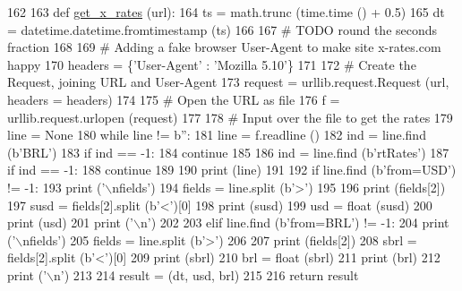 \begin{DoxyCode}
162 
163 \textcolor{keyword}{def }\hyperlink{namespaceraw__urlparser_a264ca664879b007ee92399e30ec0d9bc}{get\_x\_rates} (url):
164     ts = math.trunc (time.time () + 0.5)
165     dt = datetime.datetime.fromtimestamp (ts)
166     
167     \textcolor{comment}{# TODO round the seconds fraction}
168     
169     \textcolor{comment}{# Adding a fake browser User-Agent to make site x-rates.com happy}
170     headers = \{\textcolor{stringliteral}{'User-Agent'} : \textcolor{stringliteral}{'Mozilla 5.10'}\}
171         
172     \textcolor{comment}{# Create the Request, joining URL and User-Agent}
173     request = urllib.request.Request (url, headers = headers)
174 
175     \textcolor{comment}{# Open the URL as file}
176     f = urllib.request.urlopen (request)
177     
178     \textcolor{comment}{# Input over the file to get the rates}
179     line = \textcolor{keywordtype}{None}
180     \textcolor{keywordflow}{while} line != b\textcolor{stringliteral}{''}:
181         line = f.readline ()
182         ind = line.find (b\textcolor{stringliteral}{'BRL'})
183         \textcolor{keywordflow}{if} ind == -1:
184             \textcolor{keywordflow}{continue} 
185         
186         ind = line.find (b\textcolor{stringliteral}{'rtRates'})
187         \textcolor{keywordflow}{if} ind == -1:
188             \textcolor{keywordflow}{continue} 
189         
190         \textcolor{keywordflow}{print} (line)
191         
192         \textcolor{keywordflow}{if} line.find (b\textcolor{stringliteral}{'from=USD'}) != -1:
193             \textcolor{keywordflow}{print} (\textcolor{stringliteral}{'\(\backslash\)nfields'})
194             fields = line.split (b\textcolor{stringliteral}{'>'})
195             
196             \textcolor{keywordflow}{print} (fields[2])
197             susd = fields[2].split (b\textcolor{stringliteral}{'<'})[0]
198             \textcolor{keywordflow}{print} (susd)
199             usd = float (susd)
200             \textcolor{keywordflow}{print} (usd)
201             \textcolor{keywordflow}{print} (\textcolor{stringliteral}{'\(\backslash\)n'})
202         
203         \textcolor{keywordflow}{elif} line.find (b\textcolor{stringliteral}{'from=BRL'}) != -1:
204             \textcolor{keywordflow}{print} (\textcolor{stringliteral}{'\(\backslash\)nfields'})
205             fields = line.split (b\textcolor{stringliteral}{'>'})
206             
207             \textcolor{keywordflow}{print} (fields[2])
208             sbrl = fields[2].split (b\textcolor{stringliteral}{'<'})[0]
209             \textcolor{keywordflow}{print} (sbrl)
210             brl = float (sbrl)
211             \textcolor{keywordflow}{print} (brl)
212             \textcolor{keywordflow}{print} (\textcolor{stringliteral}{'\(\backslash\)n'})
213             
214     result = (dt, usd, brl)
215     
216     \textcolor{keywordflow}{return} result

\end{DoxyCode}


